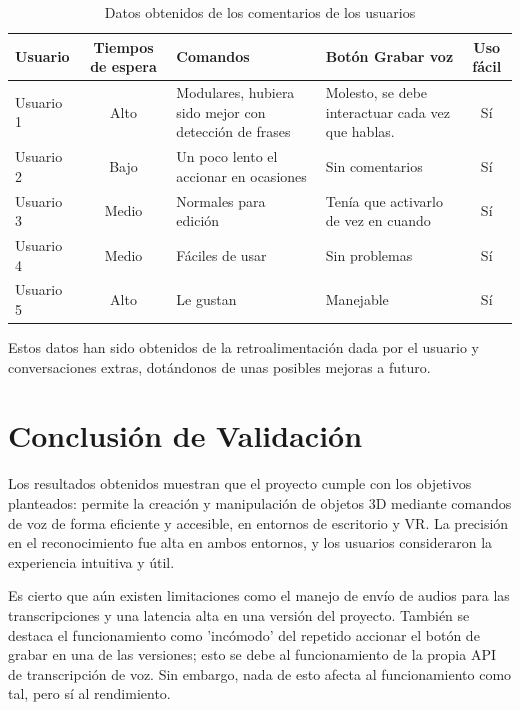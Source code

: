 \documentclass[a4paper, 12pt]{book}
\let\cleardoublepage\clearpage
\begin{document}
\begin{table}[htbp]
\centering
\begin{tabular}{|l|c|p{4cm}|p{4cm}|c|}
\hline
\textbf{Usuario} & \textbf{Tiempos de espera} & \textbf{Comandos} & \textbf{Botón Grabar voz} & \textbf{Uso fácil} \\
\hline
Usuario 1 & Alto & Modulares, hubiera sido mejor con detección de frases & Molesto, se debe interactuar cada vez que hablas. & Sí\\
\hline
Usuario 2 & Bajo & Un poco lento el accionar en ocasiones & Sin comentarios & Sí\\
\hline
Usuario 3 & Medio & Normales para edición & Tenía que activarlo de vez en cuando & Sí\\
\hline
Usuario 4 & Medio & Fáciles de usar & Sin problemas & Sí\\
\hline
Usuario 5 & Alto & Le gustan & Manejable & Sí\\
\hline
\end{tabular}
\caption{Datos obtenidos de los comentarios de los usuarios}
\label{tab:comentarios}
\end{table}

Estos datos han sido obtenidos de la retroalimentación dada por el usuario y conversaciones extras, dotándonos de unas posibles mejoras a futuro.
\section{Conclusión de Validación}

Los resultados obtenidos muestran que el proyecto cumple con los objetivos planteados: permite la creación y manipulación de objetos 3D mediante comandos de voz de forma eficiente y accesible, en entornos de escritorio y VR. La precisión en el reconocimiento fue alta en ambos entornos, y los usuarios consideraron la experiencia intuitiva y útil.

Es cierto que aún existen limitaciones como el manejo de envío de audios para las transcripciones y una latencia alta en una versión del proyecto. También se destaca el funcionamiento como 'incómodo' del repetido accionar el botón de grabar en una de las versiones; esto se debe al funcionamiento de la propia API de transcripción de voz. Sin embargo, nada de esto afecta al funcionamiento como tal, pero sí al rendimiento.

\cleardoublepage

\end{document}
